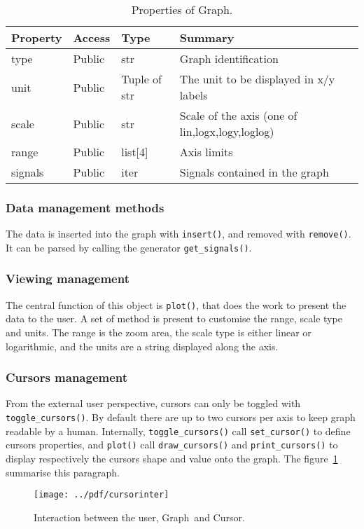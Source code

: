 \documentclass[a4paper,11pt]{article}
\newcommand{\meth}[1]{\texttt{#1()}}
\newcommand{\cls}[1]{\textsf{#1}}
\newcommand{\graph}{\cls{Graph}}
\newcommand{\cursor}{\cls{Cursor}}
\begin{document}
\begin{table}[htbp]
  \centering\small\sf
  \begin{tabular}{llll}
    \hline
    Property & Access & Type & Summary \\
    \hline
    type & Public & str & Graph identification\\
    unit & Public & Tuple of str & The unit to be displayed in x/y labels\\
    scale & Public & str & Scale of the axis (one of lin,logx,logy,loglog) \\
    range & Public & list[4] & Axis limits \\
    signals & Public & iter & Signals contained in the graph\\
    \hline
  \end{tabular}
  \caption{Properties of \graph.}
  \label{tab:graphs:props}
\end{table}
\subsubsection{Data management methods}
The data is inserted into the graph with \meth{insert}, and removed with \meth{remove}.
It can be parsed by calling the generator \meth{get\_signals}.

\subsubsection{Viewing management}
The central function of this object is \meth{plot}, that does the work to present the data to the user.
A set of method is present to customise the range, scale type and units.
The range is the zoom area, the scale type is either linear or logarithmic, and the units are a string displayed along the axis.

\subsubsection{Cursors management}
From the external user perspective, cursors can only be toggled with \meth{toggle\_cursors}.
By default there are up to two cursors per axis to keep graph readable by a human.
Internally, \meth{toggle\_cursors} call \meth{set\_cursor} to define cursors properties, and \meth{plot} call \meth{draw\_cursors} and \meth{print\_cursors} to display respectively the cursors shape and value onto the graph.
The figure~\ref{fig:cursorinter} summarise this paragraph.

\begin{figure}[htbp]
  \centering
  \texttt{[image: ../pdf/cursorinter]}
  \caption{Interaction between the user, \graph\ and \cursor.}
  \label{fig:cursorinter}
\end{figure}
\end{document}
